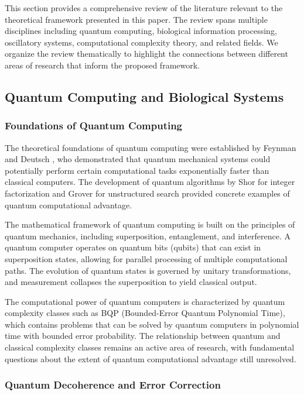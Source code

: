 \documentclass[12pt,a4paper]{article}
\theoremstyle{definition}
\begin{document}
This section provides a comprehensive review of the literature relevant to the theoretical framework presented in this paper. The review spans multiple disciplines including quantum computing, biological information processing, oscillatory systems, computational complexity theory, and related fields. We organize the review thematically to highlight the connections between different areas of research that inform the proposed framework.

\subsection{Quantum Computing and Biological Systems}

\subsubsection{Foundations of Quantum Computing}

The theoretical foundations of quantum computing were established by Feynman \cite{feynman1982simulating} and Deutsch \cite{deutsch1985quantum}, who demonstrated that quantum mechanical systems could potentially perform certain computational tasks exponentially faster than classical computers. The development of quantum algorithms by Shor \cite{shor1994algorithms} for integer factorization and Grover \cite{grover1996fast} for unstructured search provided concrete examples of quantum computational advantage.

The mathematical framework of quantum computing is built on the principles of quantum mechanics, including superposition, entanglement, and interference. A quantum computer operates on quantum bits (qubits) that can exist in superposition states, allowing for parallel processing of multiple computational paths. The evolution of quantum states is governed by unitary transformations, and measurement collapses the superposition to yield classical output.

The computational power of quantum computers is characterized by quantum complexity classes such as BQP (Bounded-Error Quantum Polynomial Time), which contains problems that can be solved by quantum computers in polynomial time with bounded error probability. The relationship between quantum and classical complexity classes remains an active area of research, with fundamental questions about the extent of quantum computational advantage still unresolved.

\subsubsection{Quantum Decoherence and Error Correction}
\end{document}
